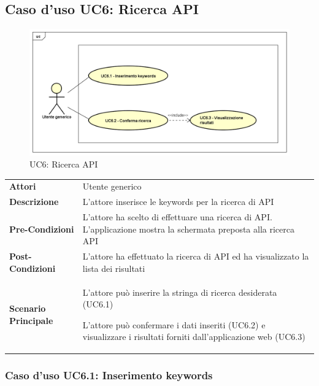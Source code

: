 \newpage
\subsection{Caso d'uso UC6: Ricerca API}
\label{UC6}
\begin{figure}[ht]
	\centering
	\includegraphics[scale=0.45]{UML/UC6.png}
	\caption{UC6: Ricerca API}
\end{figure}

\begin{longtable}{ l | p{11cm}}
	\hline
	\rowcolor{Gray}
	 \multicolumn{2}{c}{UC6 - Ricerca API} \\
	 \hline
	\textbf{Attori} & Utente generico \\
	\textbf{Descrizione} & L'attore inserisce le keywords per la ricerca di API \\
	\textbf{Pre-Condizioni} & L'attore ha scelto di effettuare una ricerca di API. L'applicazione mostra la schermata preposta alla ricerca API \\
	\textbf{Post-Condizioni} & L'attore ha effettuato la ricerca di API ed ha visualizzato la lista dei risultati \\
	\textbf{Scenario Principale} & 
	\begin{enumerate*}[label=(\arabic*.),itemjoin={\newline}]
		\item L'attore può inserire la stringa di ricerca desiderata (UC6.1)
		\item L'attore può confermare i dati inseriti (UC6.2) e visualizzare i risultati forniti dall'applicazione web (UC6.3)
	\end{enumerate*}\\
\end{longtable}

\subsubsection{Caso d'uso UC6.1: Inserimento keywords}
\label{UC6_1}

